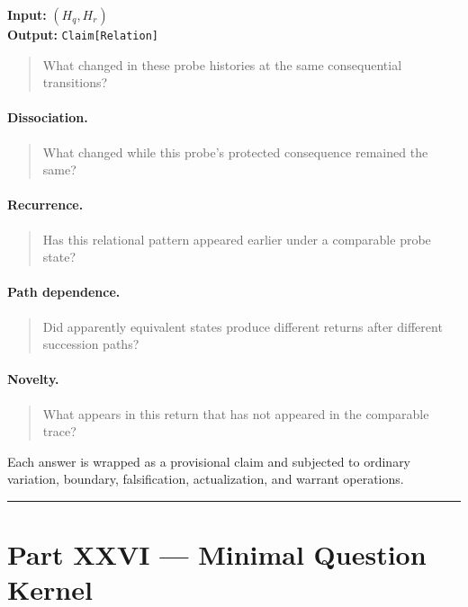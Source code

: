 \documentclass[
]{article}
\begin{document}
\textbf{Input:} \((H_q,H_r)\)\\
\textbf{Output:} \texttt{Claim[Relation]}

\begin{quote}
What changed in these probe histories at the same consequential transitions?
\end{quote}

\paragraph{Dissociation.}

\begin{quote}
What changed while this probe's protected consequence remained the same?
\end{quote}

\paragraph{Recurrence.}

\begin{quote}
Has this relational pattern appeared earlier under a comparable probe state?
\end{quote}

\paragraph{Path dependence.}

\begin{quote}
Did apparently equivalent states produce different returns after different
succession paths?
\end{quote}

\paragraph{Novelty.}

\begin{quote}
What appears in this return that has not appeared in the comparable trace?
\end{quote}

Each answer is wrapped as a provisional claim and subjected to ordinary
variation, boundary, falsification, actualization, and warrant operations.

\begin{center}\rule{0.5\linewidth}{0.5pt}\end{center}

\section{Part XXVI --- Minimal Question
Kernel}\label{part-xxvi-minimal-question-kernel}
\end{document}
